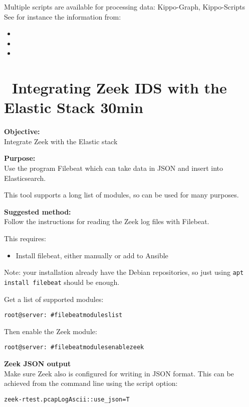 \documentclass[a4paper,11pt,notitlepage]{report}
\begin{document}
Multiple scripts are available for processing data: Kippo-Graph, Kippo-Scripts
See for instance the information from:
\begin{itemize}
\item {}
\item {}
\item {}
\end{itemize}



\chapter{\faExclamationTriangle\ Integrating Zeek IDS with the Elastic Stack 30min}
\label{ex:zeek-to-elastic}

{\bf Objective:}\\
Integrate Zeek with the Elastic stack

{\bf Purpose:}\\
Use the program Filebeat which can take data in JSON and insert into Elasticsearch.

This tool supports a long list of modules, so can be used for many purposes.

{\bf Suggested method:}\\
Follow the instructions for reading the Zeek log files with Filebeat.

This requires:
\begin{itemize}
\item Install filebeat, either manually or add to Ansible
\end{itemize}

Note: your installation already have the Debian repositories, so just using \verb+apt install filebeat+ should be enough.

Get a list of supported modules:
\begin{alltt}
root@server:~# filebeat modules list
\end{alltt}

Then enable the Zeek module:
\begin{alltt}
root@server:~# filebeat modules enable zeek
\end{alltt}

{\bf Zeek JSON output}\\
Make sure Zeek also is configured for writing in JSON format. This can be achieved from the command line using the script option:
\begin{alltt}
zeek -r test.pcap LogAscii::use_json=T
\end{alltt}
\end{document}
